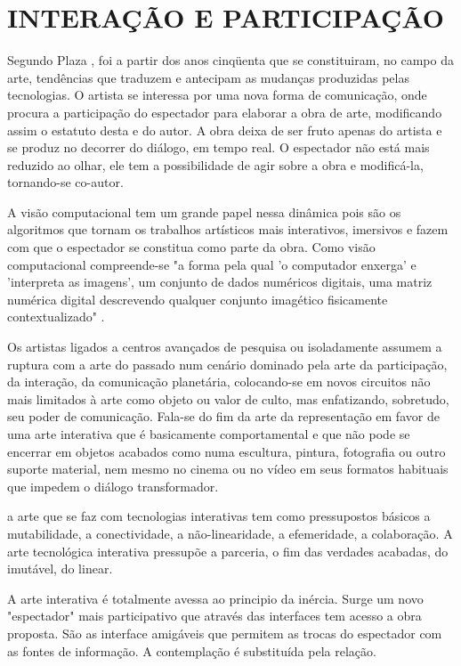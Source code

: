 \chapter{INTERAÇÃO E PARTICIPAÇÃO}

Segundo Plaza , foi a partir dos anos cinqüenta que se constituiram, no campo da arte, tendências que traduzem e antecipam as mudanças produzidas pelas tecnologias. O artista se interessa por uma nova forma de comunicação, onde procura a participação do espectador para elaborar a obra de arte, modificando assim o estatuto desta e do autor. A obra deixa de ser fruto apenas do artista e se produz no decorrer do diálogo, em tempo real. O espectador não está mais reduzido ao olhar, ele tem a possibilidade de agir sobre a obra e modificá-la, tornando-se co-autor.

A visão computacional tem um grande papel nessa dinâmica pois são os algoritmos que tornam os trabalhos artísticos mais interativos, imersivos e fazem com que o espectador se constitua como parte da obra. Como visão computacional compreende-se "a forma pela qual 'o computador enxerga' e 'interpreta as imagens', um conjunto de dados numéricos digitais, uma matriz numérica digital descrevendo qualquer conjunto imagético fisicamente contextualizado" \cite[p. 134]{caetano}.
				

Os artistas ligados a centros avançados de pesquisa ou isoladamente assumem a ruptura com a arte do passado num cenário dominado pela arte da participação, da interação, da comunicação planetária, colocando-se em novos circuitos não mais limitados à arte como objeto ou valor de culto, mas enfatizando, sobretudo, seu poder de comunicação. Fala-se do fim da arte da representação em favor de uma arte interativa que é basicamente comportamental e que não pode se encerrar em objetos acabados como numa escultura, pintura, fotografia ou outro suporte material, nem mesmo no cinema ou no vídeo em seus formatos habituais que impedem o diálogo transformador. \cite[p.17-18]{domingues}				
				
a arte que se faz com tecnologias interativas tem como pressupostos básicos a mutabilidade, a conectividade, a não-linearidade, a efemeridade, a colaboração. A arte tecnológica interativa pressupõe a parceria, o fim das verdades acabadas, do imutável, do linear. \cite[p.19]{domingues}

A arte interativa é totalmente avessa ao principio da inércia. Surge um novo "espectador" mais participativo que através das interfaces tem acesso a obra proposta. São as interface amigáveis que permitem as trocas do espectador com as fontes de informação. A contemplação é substituída pela relação. \cite[p.22]{domingues}

